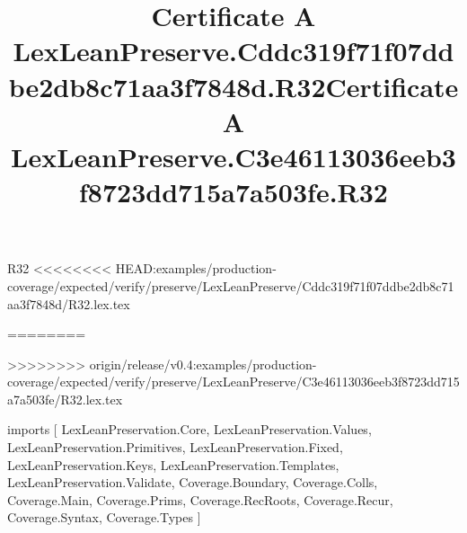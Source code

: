 \begin{lexlean}{R32}
<<<<<<<< HEAD:examples/production-coverage/expected/verify/preserve/LexLeanPreserve/Cddc319f71f07ddbe2db8c71aa3f7848d/R32.lex.tex
\title{Certificate A LexLeanPreserve.Cddc319f71f07ddbe2db8c71aa3f7848d.R32}
========
\title{Certificate A LexLeanPreserve.C3e46113036eeb3f8723dd715a7a503fe.R32}
>>>>>>>> origin/release/v0.4:examples/production-coverage/expected/verify/preserve/LexLeanPreserve/C3e46113036eeb3f8723dd715a7a503fe/R32.lex.tex
\begin{coremodule}
imports [
  LexLeanPreservation.Core,
  LexLeanPreservation.Values,
  LexLeanPreservation.Primitives,
  LexLeanPreservation.Fixed,
  LexLeanPreservation.Keys,
  LexLeanPreservation.Templates,
  LexLeanPreservation.Validate,
  Coverage.Boundary,
  Coverage.Colls,
  Coverage.Main,
  Coverage.Prims,
  Coverage.RecRoots,
  Coverage.Recur,
  Coverage.Syntax,
  Coverage.Types
]


\end{coremodule}
\end{lexlean}
